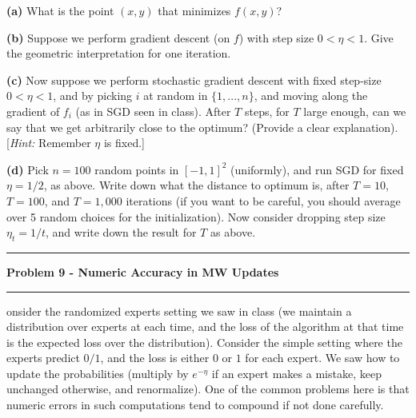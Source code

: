 \documentclass[11pt]{article}
\newcommand\question[2]{\vspace{.25in}\hrule\textbf{#1}\vspace{.5em}\hrule\vspace{.10in}}
\renewcommand\part[1]{\vspace{.10in}\textbf{(#1)}}
\begin{document}
\part{a} What is the point $(x , y)$ that minimizes $f(x, y)$?


\part{b} Suppose we perform gradient descent (on $f$) with step size $0 < \eta < 1$. Give the geometric interpretation for one iteration.


\part{c} Now suppose we perform stochastic gradient descent with fixed step-size $0 < \eta < 1$, and by picking $i$ at random in $\{1, ... , n\}$, and moving along the gradient of $f_i$ (as in SGD seen in class). After $T$ steps, for $T$ large enough, can we say that we get arbitrarily close to the optimum? (Provide a clear explanation). [\textit{Hint:} Remember $\eta$ is fixed.]


\part{d} Pick $n = 100$ random points in $[-1, 1]^2$ (uniformly), and run SGD for fixed $\eta = 1/2$, as above. Write down what the distance to optimum is, after $T = 10$, $T = 100$, and $T = 1,000$ iterations (if you want to be careful, you should average over 5 random choices for the initialization). Now consider dropping step size $\eta_t = 1/t$, and write down the result for $T$ as above.


\question{Problem 9 - Numeric Accuracy in MW Updates}

Consider the randomized experts setting we saw in class (we maintain a distribution over experts at each time, and the loss of the algorithm at that time is the expected loss over the distribution). Consider the simple setting where the experts predict $0/1$, and the loss is either $0$ or $1$ for each expert. We saw how to update the probabilities (multiply by $e^{-\eta}$ if an expert makes a mistake, keep unchanged otherwise, and renormalize). One of the common problems here is that numeric errors in such computations tend to compound if not done carefully.
\end{document}
